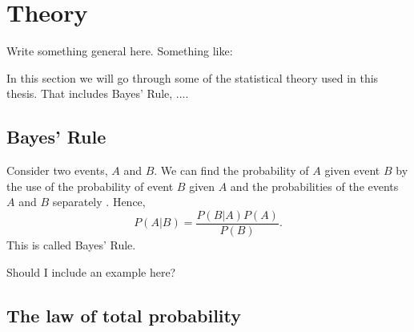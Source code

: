 \newpage
\section{Theory}
Write something general here. Something like:

In this section we will go through some of the statistical theory used in this thesis. That includes Bayes' Rule, .... 

\subsection{Bayes' Rule}
Consider two events, $A$ and $B$. We can find the probability of $A$ given event $B$ by the use of the probability of event $B$ given $A$ and the probabilities of the events $A$ and $B$ separately \citep{statinf}. Hence,
\begin{equation}
\label{bayesrule}
    P(A|B)=\frac{P(B|A)P(A)}{P(B)}.
\end{equation}
This is called Bayes' Rule. 

Should I include an example here?


\subsection{The law of total probability}


